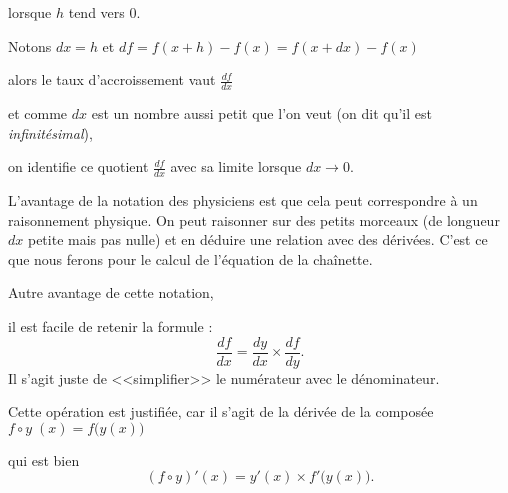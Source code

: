 lorsque $h$ tend vers $0$.

\change
Notons $dx = h$ et $df = f(x+h)-f(x) = f(x+dx)-f(x)$ 

\change
alors le taux d'accroissement vaut
$\frac{df}{dx}$ 

\change
et comme $dx$ est un nombre aussi petit que l'on veut 
(on dit qu'il est \emph{infinitésimal}),

\change
on identifie ce quotient $\frac{df}{dx}$ 
avec sa limite lorsque $dx \to 0$.

L'avantage de la notation des physiciens est que cela peut correspondre à un raisonnement physique.
On peut raisonner sur des petits morceaux (de longueur $dx$ petite mais pas nulle) et en déduire 
une relation avec des dérivées. C'est ce que nous ferons pour le calcul de l'équation de la chaînette.

\change
Autre avantage de cette notation, 

\change
il est facile de retenir la formule :
$$\frac{df}{dx} = \frac{dy}{dx}\times\frac{df}{dy}.$$
Il s'agit juste de <<simplifier>> le numérateur avec le dénominateur.

\change
Cette opération est justifiée, car il s'agit de la dérivée de la composée 
$f \circ y \; (x) = f\big( y(x) \big)$

\change
qui est bien 
$$\left(f \circ y \right)'(x) = y'(x) \times f'\big( y(x) \big).$$





